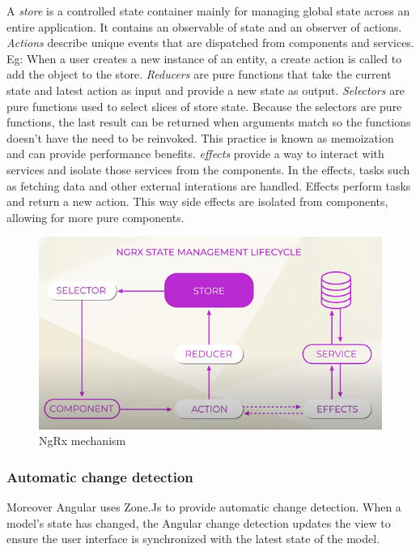 A \emph{store} is a controlled state container mainly for managing global state across an entire application. It contains an observable of state and an observer of actions. \emph{Actions} describe unique events that are dispatched from components and services. Eg: When a user creates a new instance of an entity, a create action is called to add the object to the store. \emph{Reducers} are pure functions that take the current state and latest action as input and provide a new state as output. \emph{Selectors} are pure functions used to select slices of store state. Because the selectors are pure functions, the last result can be returned when arguments match so the functions doesn't have the need to be reinvoked. This practice is known as memoization and can provide performance benefits. \emph{effects} provide a way to interact with services and isolate those services from the components. In the effects, tasks such as fetching data and other external interations are handled. Effects perform tasks and return a new action. This way side effects are isolated from components, allowing for more pure components.

\autocite{AltexSoft}
\begin{figure}[h!]
    \caption{NgRx mechanism}
    \centering
    \includegraphics[width=\textwidth]{img/ngrx.png} 
\end{figure}

\subsubsection{Automatic change detection}
Moreover Angular uses Zone.Js to provide automatic change detection. When a model's state has changed, the Angular change detection updates the view to ensure the user interface is synchronized with the latest state of the model.
\autocite{Kumar2020}

